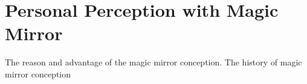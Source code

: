 \chapter{Personal Perception with Magic Mirror}
The reason and advantage of the magic mirror conception. 
The history of magic mirror conception


